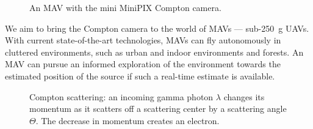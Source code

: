 \documentclass[a4paper,11pt,titlepage,twoside]{book}
\begin{document}
\begin{figure}
  \centering
  \hfill%
  \caption{An \ac{MAV} with the mini MiniPIX Compton camera.}
  \label{fig:timepix}
\end{figure}


We aim to bring the Compton camera to the world of \acp{MAV} --- sub-\SI{250}{\gram} \acp{UAV}.
With current state-of-the-art technologies, \acp{MAV} can fly autonomously in cluttered environments, such as urban and indoor environments and forests.
An \ac{MAV} can pursue an informed exploration of the environment towards the estimated position of the source if such a real-time estimate is available.


\begin{figure}[!b]
  \centering
  \resizebox{0.25\textwidth}{!}{%
    
  }
  \caption{
    Compton scattering: an incoming gamma photon $\lambda$ changes its momentum as it scatters off a scattering center by a scattering angle $\Theta$.
    The decrease in momentum creates an electron.
  }
  \label{fig:compton_scattering}
\end{figure}


\end{document}
